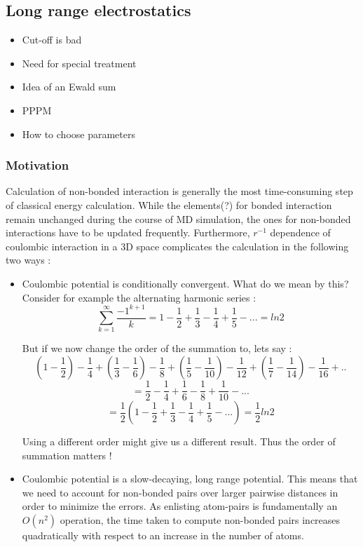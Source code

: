 \documentclass[9pt,bestpractices]{livecoms}
\begin{document}


\subsection{Long range electrostatics}
\label{sec:lr_electrostatics}
\begin{itemize}
\item Cut-off is bad
\item Need for special treatment
\item Idea of an Ewald sum
\item PPPM
\item How to choose parameters
\end{itemize}


\subsubsection{Motivation}

Calculation of non-bonded interaction is generally the most time-consuming step of classical energy calculation. While the elements(?) for bonded interaction remain unchanged during the course of MD simulation, the ones for non-bonded interactions have to be updated frequently. Furthermore, $r^{-1} $ dependence  of coulombic interaction in a 3D space complicates the calculation in the following two ways :
\begin{itemize}
\item Coulombic potential is conditionally convergent. What do we mean by this? Consider for example the alternating harmonic series : \\
\[
\sum_{k=1}^{\infty} \frac{-1^{k+1}}{k} = 1 - \frac{1}{2} + \frac{1}{3} - \frac{1}{4} + \frac{1}{5} - ... = ln 2 
\]

But if we now change the order of the summation to, lets say :
\[
( 1 - \frac{1}{2})  - \frac{1}{4} + (\frac{1}{3} - \frac{1}{6}) - \frac{1}{8} + (\frac{1}{5} - \frac{1}{10}) - \frac{1}{12} + (\frac{1}{7} - \frac{1}{14}) - \frac{1}{16} + .. 
\]
\[
= \frac{1}{2} - \frac{1}{4} + \frac{1}{6} - \frac{1}{8} + \frac{1}{10} - ... 
\]
\[
= \frac{1}{2} (1 - \frac{1}{2} + \frac{1}{3} - \frac{1}{4} + \frac{1}{5} - ...) = \frac{1}{2} ln 2
\]

Using a different order might give us a different result. Thus the order of summation matters !

\item Coulombic potential is a slow-decaying, long range potential. This means that we need to account for non-bonded pairs over larger pairwise distances in order to minimize the errors. As enlisting atom-pairs is fundamentally an $O(n^2) $ operation, the time taken to compute non-bonded pairs increases quadratically with respect to an increase in the number of atoms.   
\end{itemize} 
\end{document}
